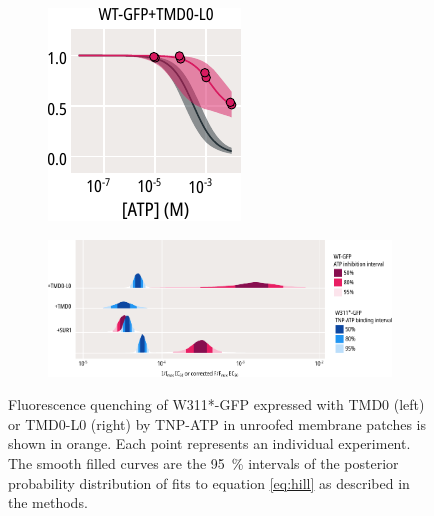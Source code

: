 \begin{figure}[h]
\begin{subfigure}[t]{0.22\textwidth}
		\includegraphics[width=\textwidth]{tmd0_atp_1.pdf}
	\end{subfigure}
	\vfill
	\begin{subfigure}[t]{0.9\textwidth}
		\caption{}\label{ch6fig:tmd0s_ec50s}
		\centering
		\includegraphics[width=\textwidth]{tmd0s_ec50s.pdf}
	\end{subfigure}
	\caption[TMD0 and TMD0-LO subtly alter binding to Kir6.2]{
	 Fluorescence quenching of W311*-GFP expressed with TMD0 (left) or TMD0-L0 (right) by TNP-ATP in unroofed membrane patches is shown in orange.
	Each point represents an individual experiment.
	The smooth filled curves are the \SI{95}{\percent} intervals of the posterior probability distribution of fits to equation \ref{eq:hill} as described in the methods.
}
\end{figure}
